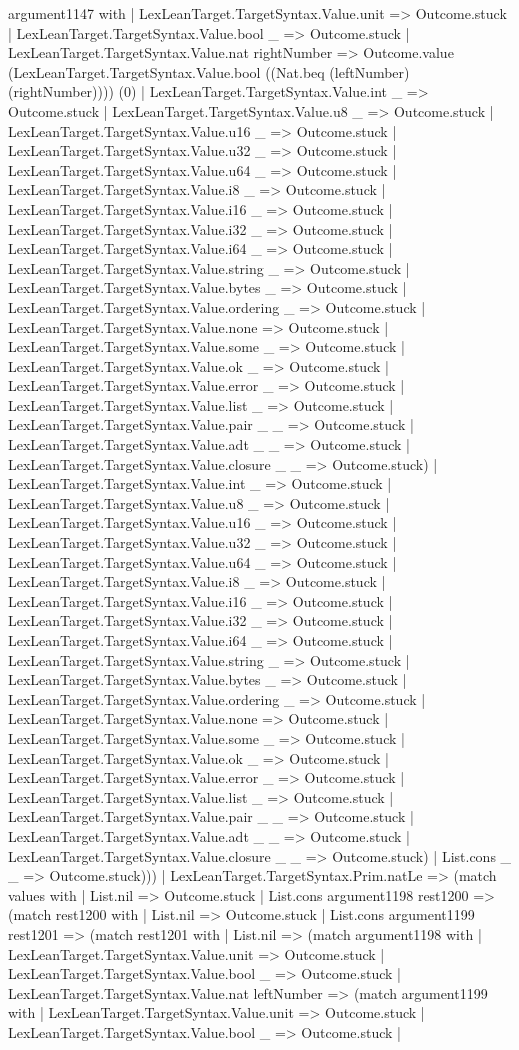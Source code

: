 \documentclass[11pt]{article}
\begin{document}
argument1147 with | LexLeanTarget.TargetSyntax.Value.unit => Outcome.stuck | LexLeanTarget.TargetSyntax.Value.bool \_ => Outcome.stuck | LexLeanTarget.TargetSyntax.Value.nat rightNumber => Outcome.value (LexLeanTarget.TargetSyntax.Value.bool ((Nat.beq (leftNumber) (rightNumber)))) (0) | LexLeanTarget.TargetSyntax.Value.int \_ => Outcome.stuck | LexLeanTarget.TargetSyntax.Value.u8 \_ => Outcome.stuck | LexLeanTarget.TargetSyntax.Value.u16 \_ => Outcome.stuck | LexLeanTarget.TargetSyntax.Value.u32 \_ => Outcome.stuck | LexLeanTarget.TargetSyntax.Value.u64 \_ => Outcome.stuck | LexLeanTarget.TargetSyntax.Value.i8 \_ => Outcome.stuck | LexLeanTarget.TargetSyntax.Value.i16 \_ => Outcome.stuck | LexLeanTarget.TargetSyntax.Value.i32 \_ => Outcome.stuck | LexLeanTarget.TargetSyntax.Value.i64 \_ => Outcome.stuck | LexLeanTarget.TargetSyntax.Value.string \_ => Outcome.stuck | LexLeanTarget.TargetSyntax.Value.bytes \_ => Outcome.stuck | LexLeanTarget.TargetSyntax.Value.ordering \_ => Outcome.stuck | LexLeanTarget.TargetSyntax.Value.none => Outcome.stuck | LexLeanTarget.TargetSyntax.Value.some \_ => Outcome.stuck | LexLeanTarget.TargetSyntax.Value.ok \_ => Outcome.stuck | LexLeanTarget.TargetSyntax.Value.error \_ => Outcome.stuck | LexLeanTarget.TargetSyntax.Value.list \_ => Outcome.stuck | LexLeanTarget.TargetSyntax.Value.pair \_ \_ => Outcome.stuck | LexLeanTarget.TargetSyntax.Value.adt \_ \_ => Outcome.stuck | LexLeanTarget.TargetSyntax.Value.closure \_ \_ => Outcome.stuck) | LexLeanTarget.TargetSyntax.Value.int \_ => Outcome.stuck | LexLeanTarget.TargetSyntax.Value.u8 \_ => Outcome.stuck | LexLeanTarget.TargetSyntax.Value.u16 \_ => Outcome.stuck | LexLeanTarget.TargetSyntax.Value.u32 \_ => Outcome.stuck | LexLeanTarget.TargetSyntax.Value.u64 \_ => Outcome.stuck | LexLeanTarget.TargetSyntax.Value.i8 \_ => Outcome.stuck | LexLeanTarget.TargetSyntax.Value.i16 \_ => Outcome.stuck | LexLeanTarget.TargetSyntax.Value.i32 \_ => Outcome.stuck | LexLeanTarget.TargetSyntax.Value.i64 \_ => Outcome.stuck | LexLeanTarget.TargetSyntax.Value.string \_ => Outcome.stuck | LexLeanTarget.TargetSyntax.Value.bytes \_ => Outcome.stuck | LexLeanTarget.TargetSyntax.Value.ordering \_ => Outcome.stuck | LexLeanTarget.TargetSyntax.Value.none => Outcome.stuck | LexLeanTarget.TargetSyntax.Value.some \_ => Outcome.stuck | LexLeanTarget.TargetSyntax.Value.ok \_ => Outcome.stuck | LexLeanTarget.TargetSyntax.Value.error \_ => Outcome.stuck | LexLeanTarget.TargetSyntax.Value.list \_ => Outcome.stuck | LexLeanTarget.TargetSyntax.Value.pair \_ \_ => Outcome.stuck | LexLeanTarget.TargetSyntax.Value.adt \_ \_ => Outcome.stuck | LexLeanTarget.TargetSyntax.Value.closure \_ \_ => Outcome.stuck) | List.cons \_ \_ => Outcome.stuck))) | LexLeanTarget.TargetSyntax.Prim.natLe => (match values with | List.nil => Outcome.stuck | List.cons argument1198 rest1200 => (match rest1200 with | List.nil => Outcome.stuck | List.cons argument1199 rest1201 => (match rest1201 with | List.nil => (match argument1198 with | LexLeanTarget.TargetSyntax.Value.unit => Outcome.stuck | LexLeanTarget.TargetSyntax.Value.bool \_ => Outcome.stuck | LexLeanTarget.TargetSyntax.Value.nat leftNumber => (match argument1199 with | LexLeanTarget.TargetSyntax.Value.unit => Outcome.stuck | LexLeanTarget.TargetSyntax.Value.bool \_ => Outcome.stuck | 
\end{document}
